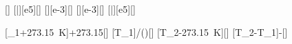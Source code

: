 [\degreeCelsius]
[\bar][e5][\pascal]
[\liter][e-3][\meter\cubed]
[\liter][e-3][\meter\cubed]
[\bar][e5][\pascal]

[\vartheta_1+\SI{273.15}{\kelvin}]{\thEiX+273.15}[\kelvin]
[T_1\cdot{}]{\TEiX*\pZwX*\VZwX/(\pEiX*\VEiX)}[\kelvin]
[T_2-\SI{273.15}{\kelvin}]{}[\degreeCelsius]
[T_2-T_1]{\TZwX-\TEiX}[\kelvin]
